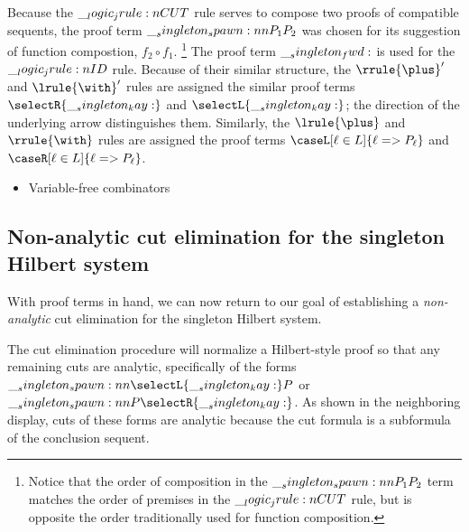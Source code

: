 Because the $\__logic_jrule:n {CUT}$ rule serves to compose two proofs of compatible sequents, the proof term $\__singleton_spawn:nn {P_1} {P_2}$ was chosen for its suggestion of function compostion, $f_2 \circ f_1$.%
\footnote{Notice that the order of composition in the $\__singleton_spawn:nn {P_1} {P_2}$ term matches the order of premises in the $\__logic_jrule:n {CUT}$ rule, but is opposite the order traditionally used for function composition.}
The proof term $\__singleton_fwd:$ is used for the $\__logic_jrule:n {ID}$ rule.
%
Because of their similar structure, the $\rrule{\plus}'$ and $\lrule{\with}'$ rules are assigned the similar proof terms $\selectR{\kay}$ and $\selectL{\kay}$; the direction of the underlying arrow distinguishes them.
Similarly, the $\lrule{\plus}$ and $\rrule{\with}$ rules are assigned the proof terms $\caseL[\ell \in L]{\ell => P_{\ell}}$ and $\caseR[\ell \in L]{\ell => P_{\ell}}$.

\begin{itemize}
\item Variable-free combinators
\end{itemize}


\subsection{Non-analytic cut elimination for the singleton Hilbert system}

With proof terms in hand, we can now return to our goal of establishing a \emph{non-analytic} cut elimination  for the singleton Hilbert system.

The cut elimination procedure will normalize a Hilbert-style proof so that any remaining cuts are analytic, specifically of the forms $\spawn{\selectL{\kay}}{P}$ or $\spawn{P}{\selectR{\kay}}$.
As shown in the neighboring display,%
%
%
cuts of these forms are analytic because the cut formula is a subformula of the conclusion sequent.

